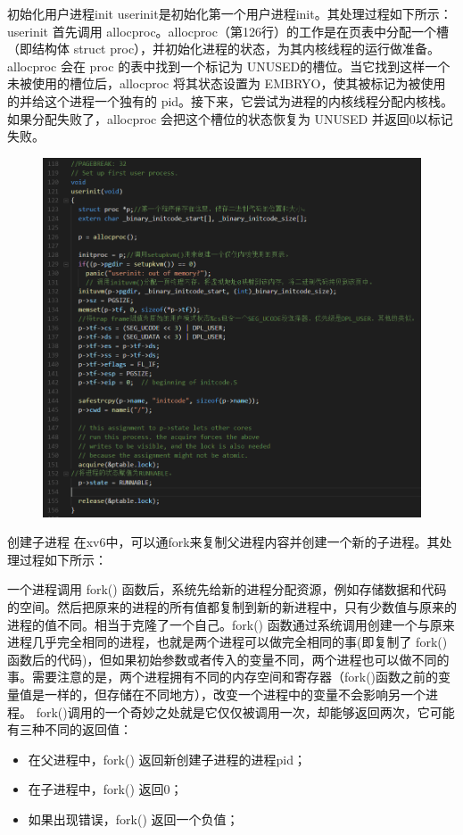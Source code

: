 \documentclass[a4paper,12pt]{report}
\begin{document}
初始化用户进程init
userinit是初始化第一个用户进程init。其处理过程如下所示：
userinit 首先调用 allocproc。allocproc（第126行）的工作是在页表中分配一个槽（即结构体 struct proc），并初始化进程的状态，为其内核线程的运行做准备。
allocproc 会在 proc 的表中找到一个标记为 UNUSED的槽位。当它找到这样一个未被使用的槽位后，allocproc 将其状态设置为 EMBRYO，使其被标记为被使用的并给这个进程一个独有的 pid。接下来，它尝试为进程的内核线程分配内核栈。如果分配失败了，allocproc 会把这个槽位的状态恢复为 UNUSED 并返回0以标记失败。
\begin{figure}[H]
	\centering
	\includegraphics [width=1.0\textwidth]{figure//image104.png}
\end{figure}


创建子进程
在xv6中，可以通fork来复制父进程内容并创建一个新的子进程。其处理过程如下所示：

一个进程调用 fork() 函数后，系统先给新的进程分配资源，例如存储数据和代码的空间。然后把原来的进程的所有值都复制到新的新进程中，只有少数值与原来的进程的值不同。相当于克隆了一个自己。fork() 函数通过系统调用创建一个与原来进程几乎完全相同的进程，也就是两个进程可以做完全相同的事(即复制了 fork() 函数后的代码)，但如果初始参数或者传入的变量不同，两个进程也可以做不同的事。需要注意的是，两个进程拥有不同的内存空间和寄存器（fork()函数之前的变量值是一样的，但存储在不同地方），改变一个进程中的变量不会影响另一个进程。
fork()调用的一个奇妙之处就是它仅仅被调用一次，却能够返回两次，它可能有三种不同的返回值：
\begin{itemize}
  \item 在父进程中，fork() 返回新创建子进程的进程pid；
  \item 在子进程中，fork() 返回0；
  \item 如果出现错误，fork() 返回一个负值；
\end{itemize}
\end{document}
